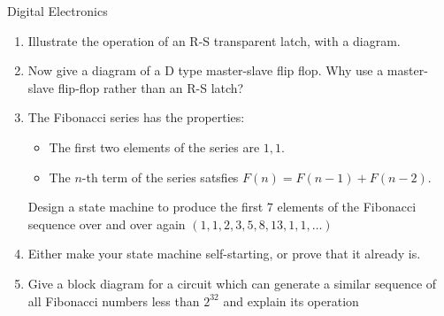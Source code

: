 \documentclass{tripos}  %
\begin{document}
\begin{question}[MockIA,year=2024,paper=1,question=2,author=rrw]{Digital Electronics}


\begin{enumerate}
\item Illustrate the operation of an R-S transparent latch, with a diagram. 
\item Now give a diagram of a D type master-slave flip flop. Why use a master-slave flip-flop rather than an R-S latch? 
\item
  The Fibonacci series has the properties:

\begin{itemize}
\item The first two elements of the series are $1, 1$.
\item The $n$-th term of the series satsfies $F(n) = F(n-1)+ F(n-2)$.
\end{itemize}

Design a state machine to produce the first $7$ elements of the Fibonacci sequence over and over again $(1, 1, 2, 3, 5, 8, 13, 1, 1, \ldots )$ 
\item Either make your state machine self-starting, or prove that it already is. 
\item Give a block diagram for a circuit which can generate a similar sequence of all Fibonacci numbers less than $2^{32}$ and explain its operation 
\end{enumerate}

\end{question}
\end{document}
